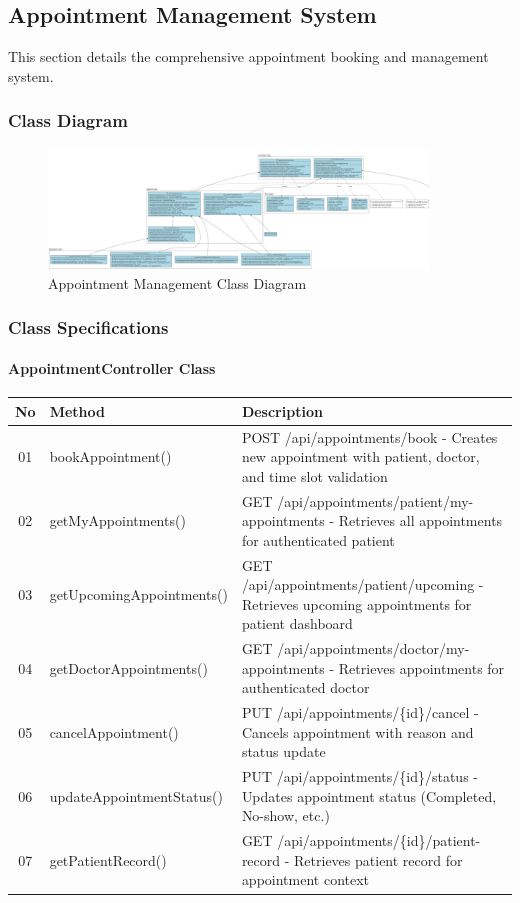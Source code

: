 \documentclass[12pt,a4paper]{article}
\begin{document}
\subsection{Appointment Management System}

This section details the comprehensive appointment booking and management system.

\subsubsection{Class Diagram}

\begin{figure}[H]
\centering
\includegraphics[width=0.9\textwidth]{diagrams/appointment_class_diagram.png}
\caption{Appointment Management Class Diagram}
\label{fig:appointment-class-diagram}
\end{figure}

\subsubsection{Class Specifications}

\paragraph{AppointmentController Class}
\begin{longtable}{|c|l|p{8cm}|}
\hline
\textbf{No} & \textbf{Method} & \textbf{Description} \\
\hline
01 & bookAppointment() & POST /api/appointments/book - Creates new appointment with patient, doctor, and time slot validation \\
\hline
02 & getMyAppointments() & GET /api/appointments/patient/my-appointments - Retrieves all appointments for authenticated patient \\
\hline
03 & getUpcomingAppointments() & GET /api/appointments/patient/upcoming - Retrieves upcoming appointments for patient dashboard \\
\hline
04 & getDoctorAppointments() & GET /api/appointments/doctor/my-appointments - Retrieves appointments for authenticated doctor \\
\hline
05 & cancelAppointment() & PUT /api/appointments/\{id\}/cancel - Cancels appointment with reason and status update \\
\hline
06 & updateAppointmentStatus() & PUT /api/appointments/\{id\}/status - Updates appointment status (Completed, No-show, etc.) \\
\hline
07 & getPatientRecord() & GET /api/appointments/\{id\}/patient-record - Retrieves patient record for appointment context \\
\hline
\end{longtable}
\end{document}
